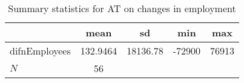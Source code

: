\begin{table}[htbp]\centering
\def\sym#1{\ifmmode^{#1}\else\(^{#1}\)\fi}
\caption{Summary statistics for AT on changes in employment}
\begin{tabular}{l*{1}{cccc}}
\hline\hline
            &        mean&          sd&         min&         max\\
\hline
difnEmployees&    132.9464&    18136.78&      -72900&       76913\\
\hline
\(N\)       &          56&            &            &            \\
\hline\hline
\end{tabular}
\end{table}
